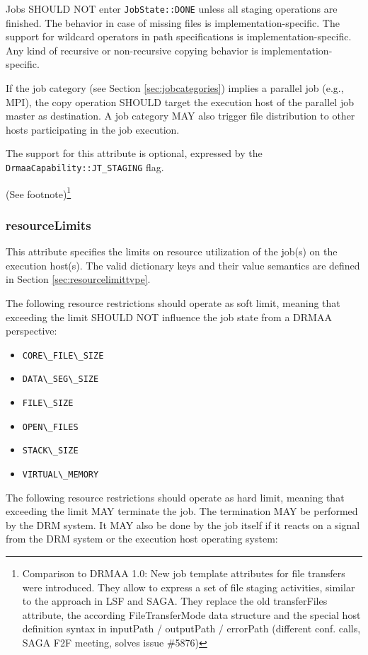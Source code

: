 \documentclass{article}
\newcommand{\h}[1]{\lstinline|#1|}
\newcommand{\rat}[1]{ {\tiny(See footnote)}\footnote{#1} }
\begin{document}
Jobs SHOULD NOT enter \h{JobState::DONE} unless all staging operations are finished. The behavior in case of missing files is implementation-specific. The support for wildcard operators in path specifications is implementation-specific. Any kind of recursive or non-recursive copying behavior is implementation-specific.

If the job category (see Section \ref{sec:jobcategories}) implies a parallel job (e.g., MPI), the copy operation SHOULD target the execution host of the parallel job master as destination. A job category MAY also trigger file distribution to other hosts participating in the job execution.

The support for this attribute is optional, expressed by the \h{DrmaaCapability::JT_STAGING} flag.

\rat{
Comparison to DRMAA 1.0: New job template attributes for file transfers were introduced. They allow to express a set of file staging activities, similar to the approach in LSF and SAGA. They replace the old transferFiles attribute, the according FileTransferMode data structure and the special host definition syntax in inputPath / outputPath / errorPath (different conf. calls, SAGA F2F meeting, solves issue \#5876)
}

\subsubsection{resourceLimits}

This attribute specifies the limits on resource utilization of the job(s) on the execution host(s). The valid dictionary keys and their value semantics are defined in Section \ref{sec:resourcelimittype}.

The following resource restrictions should operate as soft limit, meaning that exceeding the limit SHOULD NOT influence the job state from a DRMAA perspective:

\begin{itemize}
\item \h{CORE\_FILE\_SIZE}
\item \h{DATA\_SEG\_SIZE}
\item \h{FILE\_SIZE}
\item \h{OPEN\_FILES}
\item \h{STACK\_SIZE}
\item \h{VIRTUAL\_MEMORY}
\end{itemize}

The following resource restrictions should operate as hard limit, meaning that exceeding the limit MAY terminate the job. The termination MAY be performed by the DRM system. It MAY also be done by the job itself if it reacts on a signal from the DRM system or the execution host operating system:
\end{document}
